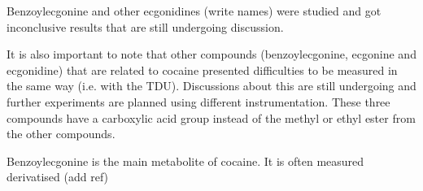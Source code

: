 Benzoylecgonine and other ecgonidines (write names) were studied and got inconclusive results that are still undergoing discussion.

It is also important to note that other compounds (benzoylecgonine, ecgonine and ecgonidine) that are related to cocaine presented difficulties to be measured in the same way (i.e. with the TDU). Discussions about this are still undergoing and further experiments are planned using different instrumentation.
These three compounds have a carboxylic acid group instead of the methyl or ethyl ester from the other compounds.

Benzoylecgonine is the main metabolite of cocaine. It is often measured derivatised (add ref)





















 
 
 

 
 
 
 
 
 
 
 
 



















